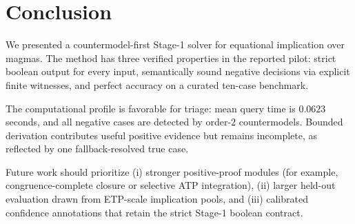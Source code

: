 \section{Conclusion}

We presented a countermodel-first Stage-1 solver for equational implication over magmas. The method has three verified properties in the reported pilot: strict boolean output for every input, semantically sound negative decisions via explicit finite witnesses, and perfect accuracy on a curated ten-case benchmark.

The computational profile is favorable for triage: mean query time is $0.0623$ seconds, and all negative cases are detected by order-$2$ countermodels. Bounded derivation contributes useful positive evidence but remains incomplete, as reflected by one fallback-resolved true case.

Future work should prioritize (i) stronger positive-proof modules (for example, congruence-complete closure or selective ATP integration), (ii) larger held-out evaluation drawn from ETP-scale implication pools, and (iii) calibrated confidence annotations that retain the strict Stage-1 boolean contract.
